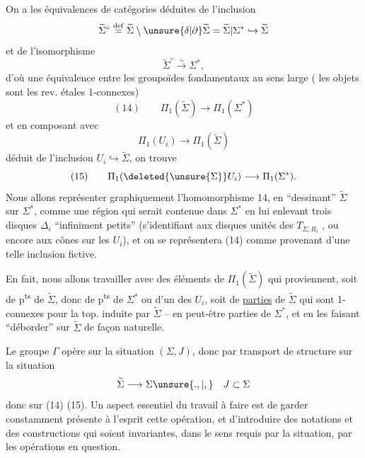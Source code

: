 On a les équivalences de catégories
déduites de l'inclusion
\[
\widetilde\Sigma^\circ \overset{\mathrm{def}}= \widetilde\Sigma\setminus\unsure{\delta|\partial}\widetilde\Sigma = \widetilde\Sigma|\Sigma^* \hookrightarrow \widetilde\Sigma
\]
et de l'isomorphisme
\[
\widetilde\Sigma^\circ \xrightarrow{\sim} \Sigma^*,
\]
d'où une équivalence entre les groupoïdes fondamentaux au sens large ( les objets sont les rev. étales 1-connexes)
\[
(14)\qquad \Pi_1(\widetilde\Sigma) \longrightarrow \Pi_1(\Sigma^*)
\]
et en composant avec
\[
\Pi_1(U_i)\longrightarrow \Pi_1(\widetilde\Sigma)
\]
déduit de l'inclusion $U_i\hookrightarrow\widetilde\Sigma$, on trouve
\[
(15)\qquad \Pi_1(\deleted{\unsure{\Sigma}}U_i)\longrightarrow\Pi_1(\Sigma^*).
\]
Nous allons représenter graphiquement l'homomorphisme 14, en ``dessinant'' $\widetilde\Sigma$ sur $\Sigma^*$, comme une région qui serait contenue dans $\Sigma^*$ en lui enlevant  trois disques  $\Delta_i$ ``infiniment petits''  (s'identifiant aux disques unités des $T_{\Sigma,R_i}$ , ou encore aux cônes sur les $U_i$), et on se représentera (14) comme provenant d'une telle inclusion fictive.

En fait, nous allons travailler avec des éléments de $\Pi_1(\widetilde\Sigma)$ qui proviennent, soit de p\textsuperscript{ts} de $\widetilde\Sigma$, donc de p\textsuperscript{ts} de $\Sigma^*$ ou d'un des $U_i$, soit de \uline{parties} de $\widetilde\Sigma$ qui sont 1-connexes pour la top. induite par $\widetilde\Sigma$ -- en  peut-être  parties  de $\Sigma^*$, et en les faisant ``déborder'' sur $\widetilde\Sigma$ de façon naturelle.

Le groupe $\Gamma$ opère sur la situation  $(\Sigma,J)$, donc par transport de structure sur la situation
\[
\widetilde\Sigma\longrightarrow\Sigma\unsure{.,|,}\quad J\subset\Sigma
\]
donc sur  (14) (15). Un aspect essentiel du travail à faire est de garder  constamment présente à l'esprit cette opération, et d'introduire des notations et des constructions qui soient invariantes, dans le sens requis par la situation, par les opérations en question.

